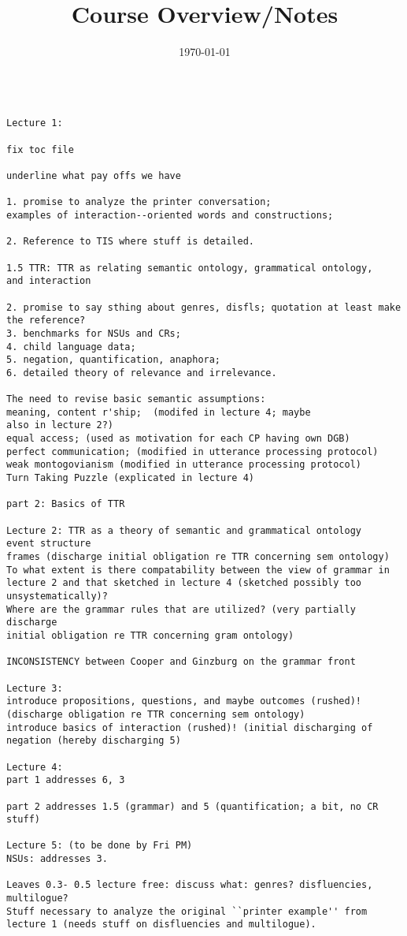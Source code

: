 \documentclass[12pt]{article}
\title{Course Overview/Notes}
\author{}
\date{\today}
\begin{document}
\maketitle

\begin{verbatim}

Lecture 1: 

fix toc file

underline what pay offs we have

1. promise to analyze the printer conversation; 
examples of interaction--oriented words and constructions;

2. Reference to TIS where stuff is detailed. 

1.5 TTR: TTR as relating semantic ontology, grammatical ontology, 
and interaction

2. promise to say sthing about genres, disfls; quotation at least make
the reference?
3. benchmarks for NSUs and CRs; 
4. child language data; 
5. negation, quantification, anaphora; 
6. detailed theory of relevance and irrelevance.

The need to revise basic semantic assumptions: 
meaning, content r'ship;  (modifed in lecture 4; maybe 
also in lecture 2?)
equal access; (used as motivation for each CP having own DGB)
perfect communication; (modified in utterance processing protocol)
weak montogovianism (modified in utterance processing protocol)
Turn Taking Puzzle (explicated in lecture 4)

part 2: Basics of TTR

Lecture 2: TTR as a theory of semantic and grammatical ontology
event structure
frames (discharge initial obligation re TTR concerning sem ontology)
To what extent is there compatability between the view of grammar in
lecture 2 and that sketched in lecture 4 (sketched possibly too 
unsystematically)?
Where are the grammar rules that are utilized? (very partially
discharge 
initial obligation re TTR concerning gram ontology)

INCONSISTENCY between Cooper and Ginzburg on the grammar front

Lecture 3:
introduce propositions, questions, and maybe outcomes (rushed)!  
(discharge obligation re TTR concerning sem ontology)
introduce basics of interaction (rushed)! (initial discharging of 
negation (hereby discharging 5)

Lecture 4:
part 1 addresses 6, 3

part 2 addresses 1.5 (grammar) and 5 (quantification; a bit, no CR
stuff)

Lecture 5: (to be done by Fri PM)
NSUs: addresses 3.

Leaves 0.3- 0.5 lecture free: discuss what: genres? disfluencies,
multilogue?
Stuff necessary to analyze the original ``printer example'' from
lecture 1 (needs stuff on disfluencies and multilogue).
 
\end{verbatim}
\end{document}
